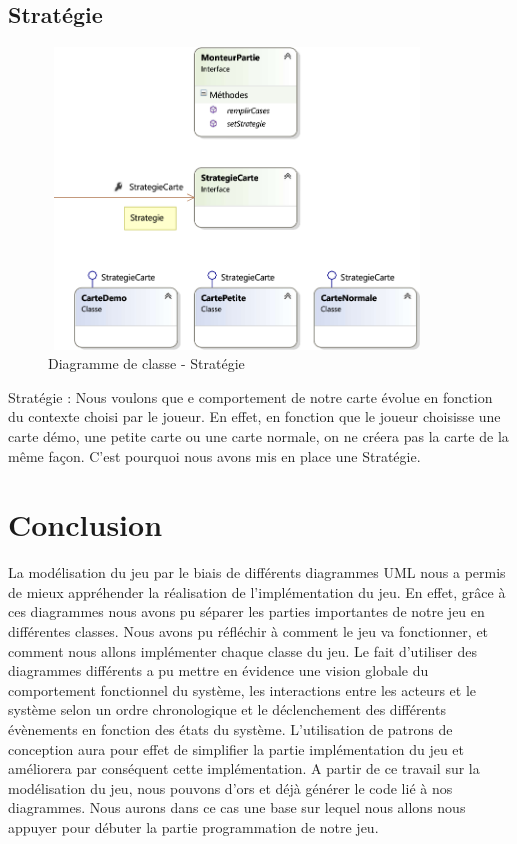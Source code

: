 \documentclass[a4paper,11pt]{article}
\begin{document}
	\subsection{Stratégie}
	\begin{figure}[ht!]
		\includegraphics[height=8cm,width=10cm]{Diagrammes/Classe/strategie.png}
		\caption{Diagramme de classe - Stratégie}
		\label{fig:strategie}
	\end{figure}
	\vspace*{1cm}
	Stratégie :
Nous voulons que e comportement de notre carte évolue en fonction du contexte choisi par le joueur. En effet, en fonction que le joueur choisisse une carte démo, une petite carte ou une carte normale, on ne créera pas la carte de la même façon. C’est pourquoi nous avons mis en place une Stratégie.

	\newpage

\section*{Conclusion}
	La modélisation du jeu par le biais de différents diagrammes UML nous a permis de mieux appréhender la réalisation de l’implémentation du jeu. En effet, grâce à ces diagrammes nous avons pu séparer les parties importantes de notre jeu en différentes classes. Nous avons pu réfléchir à comment le jeu va fonctionner, et comment nous allons implémenter chaque classe du jeu.
Le fait d’utiliser des diagrammes différents a pu mettre en évidence une vision globale du comportement fonctionnel du système, les interactions entre les acteurs et le système selon un ordre chronologique et le déclenchement des différents évènements en fonction des états du système. L’utilisation de patrons de conception aura pour effet de simplifier la partie implémentation du jeu et améliorera par conséquent cette implémentation.
A partir de ce travail sur la modélisation du jeu, nous pouvons d’ors et déjà générer le code lié à nos diagrammes. Nous aurons dans ce cas une base sur lequel nous allons nous appuyer pour débuter la partie programmation de notre jeu.

	\newpage
	\listoffigures
\end{document}
